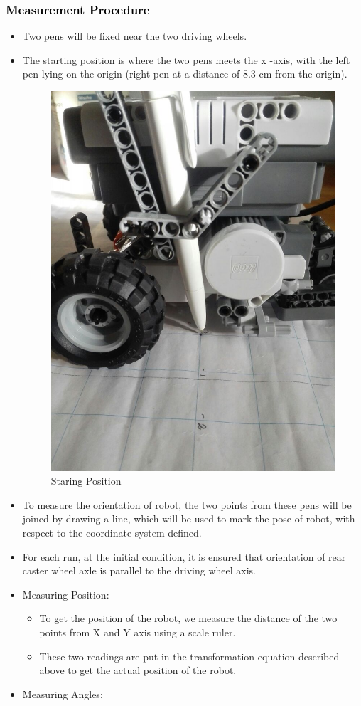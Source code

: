 \documentclass[10pt,a4paper]{article}
\begin{document}
				\subsubsection{\textcolor{black}{Measurement Procedure}}
				\begin{itemize}
					\item Two pens will be fixed near the two driving wheels.
					\item The starting position is where the two pens meets the x -axis, with the left pen lying on the origin (right pen at a distance of  8.3 cm from the origin).			
					\begin{figure}[h]
						\centering
						\includegraphics[width=0.4\linewidth]{img/starting-pt.jpeg}
						\caption{Staring Position}
						\label{fig:startingView}
					\end{figure}
					\item To measure the orientation of robot, the two points from these pens will be joined by drawing a line, which will be used to mark the pose of robot, with respect to the coordinate system defined.
					\item For each run, at the initial condition, it is ensured that orientation of rear caster wheel axle is parallel to the driving wheel axis.
					\item Measuring Position:
						\begin{itemize}
							\item To get the position of the robot, we measure the distance of the two points from X and Y axis using a scale ruler.
							\item These two readings are put in the transformation equation described above to get the actual position of the robot.
						\end{itemize}
					\item Measuring Angles:
						\begin{itemize}

\end{itemize}
\end{itemize}
\end{document}
